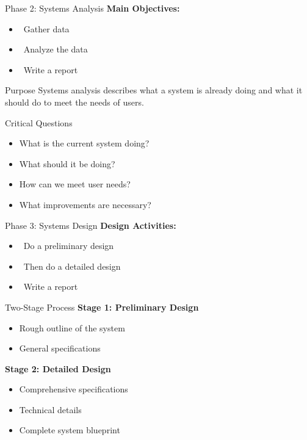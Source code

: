\documentclass[aspectratio=169]{beamer}
\begin{document}
\begin{frame}{Phase 2: Systems Analysis}
    \textbf{Main Objectives:}
    \begin{itemize}
        \item \faServer\, Gather data
        \item \faServer\, Analyze the data
        \item \faServer\, Write a report
    \end{itemize}
    
    \vspace{0.2cm}
    \begin{block}{Purpose}
        Systems analysis describes what a system is already doing and what it should do to meet the needs of users.
    \end{block}
    
    \vspace{0.2cm}
    \begin{alertblock}{Critical Questions}
        \begin{itemize}
            \item What is the current system doing?
            \item What should it be doing?
            \item How can we meet user needs?
            \item What improvements are necessary?
        \end{itemize}
    \end{alertblock}
\end{frame}

\begin{frame}{Phase 3: Systems Design}
    \textbf{Design Activities:}
    \begin{itemize}
        \item\, Do a preliminary design
        \item\, Then do a detailed design
        \item \faServer\, Write a report
    \end{itemize}
    
    \vspace{0.2cm}
    \begin{block}{Two-Stage Process}
        \textbf{Stage 1: Preliminary Design}
        \begin{itemize}
            \item Rough outline of the system
            \item General specifications
        \end{itemize}
        
        \vspace{0.2cm}
        \textbf{Stage 2: Detailed Design}
        \begin{itemize}
            \item Comprehensive specifications
            \item Technical details
            \item Complete system blueprint
        \end{itemize}
    \end{block}
\end{frame}
\end{document}
